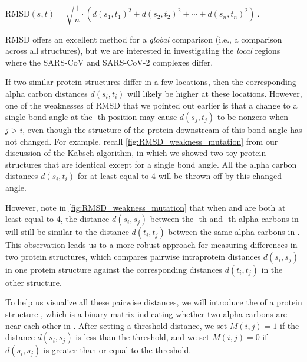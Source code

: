 \begin{center}
$\text{RMSD}(s, t) = \sqrt{\dfrac{1}{n} \cdot (d(s_1, t_1)^2 + d(s_2, t_2)^2 + \cdots + d(s_n, t_n)^2)}$\,.
\end{center}

\noindent RMSD offers an excellent method for a \textit{global} comparison (i.e., a comparison across all structures), but we are interested in investigating the \textit{local} regions where the SARS-CoV and SARS-CoV-2 complexes differ.

If two similar protein structures differ in a few locations, then the corresponding alpha carbon distances $d(s_{i}, t_{i})$ will likely be higher at these locations. However, one of the weaknesses of RMSD that we pointed out earlier is that a change to a single bond angle at the -th position may cause $d(s_{j}, t_{j})$ to be nonzero when $j > i$, even though the structure of the protein downstream of this bond angle has not changed. For example, recall \autoref{fig:RMSD_weakness_mutation} from our discussion of the Kabsch algorithm, in which we showed two toy protein structures that are identical except for a single bond angle. All the alpha carbon distances $d(s_{i}, t_{i})$ for  at least equal to 4 will be thrown off by this changed angle.

However, note in \autoref{fig:RMSD_weakness_mutation}  that when  and  are both at least equal to 4, the distance $d(s_{i}, s_{j})$ between the -th and -th alpha carbons in  will still be similar to the distance $d(t_{i}, t_{j})$ between the same alpha carbons in . This observation leads us to a more robust approach for measuring differences in two protein structures, which compares  pairwise intraprotein distances $d(s_{i}, s_{j})$ in one protein structure against the corresponding distances $d(t_{i}, t_{j})$ in the other structure.

To help us visualize all these pairwise distances, we will introduce the  of a protein structure , which is a binary matrix indicating whether two alpha carbons are near each other in . After setting a threshold distance, we set $M(i, j) = 1$ if the distance $d(s_{i}, s_{j})$ is less than the threshold, and we set $M(i, j) = 0$ if $d(s_{i}, s_{j})$ is greater than or equal to the threshold.

